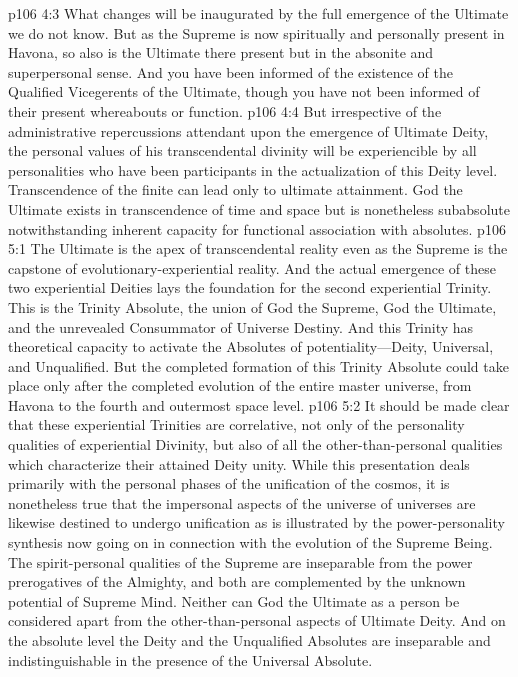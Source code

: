 \vs p106 4:3 What changes will be inaugurated by the full emergence of the Ultimate we do not know. But as the Supreme is now spiritually and personally present in Havona, so also is the Ultimate there present but in the absonite and superpersonal sense. And you have been informed of the existence of the Qualified Vicegerents of the Ultimate, though you have not been informed of their present whereabouts or function.
\vs p106 4:4 But irrespective of the administrative repercussions attendant upon the emergence of Ultimate Deity, the personal values of his transcendental divinity will be experiencible by all personalities who have been participants in the actualization of this Deity level. Transcendence of the finite can lead only to ultimate attainment. God the Ultimate exists in transcendence of time and space but is nonetheless subabsolute notwithstanding inherent capacity for functional association with absolutes.
\vs p106 5:1 The Ultimate is the apex of transcendental reality even as the Supreme is the capstone of evolutionary\hyp{}experiential reality. And the actual emergence of these two experiential Deities lays the foundation for the second experiential Trinity. This is the Trinity Absolute, the union of God the Supreme, God the Ultimate, and the unrevealed Consummator of Universe Destiny. And this Trinity has theoretical capacity to activate the Absolutes of potentiality---Deity, Universal, and Unqualified. But the completed formation of this Trinity Absolute could take place only after the completed evolution of the entire master universe, from Havona to the fourth and outermost space level.
\vs p106 5:2 It should be made clear that these experiential Trinities are correlative, not only of the personality qualities of experiential Divinity, but also of all the other\hyp{}than\hyp{}personal qualities which characterize their attained Deity unity. While this presentation deals primarily with the personal phases of the unification of the cosmos, it is nonetheless true that the impersonal aspects of the universe of universes are likewise destined to undergo unification as is illustrated by the power\hyp{}personality synthesis now going on in connection with the evolution of the Supreme Being. The spirit\hyp{}personal qualities of the Supreme are inseparable from the power prerogatives of the Almighty, and both are complemented by the unknown potential of Supreme Mind. Neither can God the Ultimate as a person be considered apart from the other\hyp{}than\hyp{}personal aspects of Ultimate Deity. And on the absolute level the Deity and the Unqualified Absolutes are inseparable and indistinguishable in the presence of the Universal Absolute.
